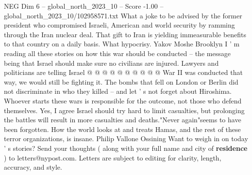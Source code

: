 \begin{textsample}{NEG Dim 6 – global\_north\_2023\_10 – Score -1.00 – global\_north\_2023\_10/102958571.txt}
What a joke to be advised by the former president who compromised Israeli, American and world security by ramming through the Iran nuclear deal.
That gift to Iran is yielding immeasurable benefits to that country on a daily basis.
What hypocrisy.
Yakov Moshe Brooklyn I ' m reading all these stories on how this war should be conducted -- the message being that Israel should make sure no civilians are injured.
Lawyers and politicians are telling Israel @ @ @ @ @ @ @ @ @ @ War II was conducted that way, we would still be fighting it.
The bombs that fell on London or Berlin did not discriminate in who they killed -- and let ' s not forget about Hiroshima.
Whoever starts these wars is responsible for the outcome, not those who defend themselves.
Yes, I agree Israel should try hard to limit casualties, but prolonging the battles will result in more casualties and deaths."Never again"seems to have been forgotten.
How the world looks at and treats Hamas, and the rest of these terror organizations, is insane.
Philip Vallone Ossining Want to weigh in on today ' s stories?
Send your thoughts ( along with your full name and city of \textbf{residence} ) to letters@nypost.com.
Letters are subject to editing for clarity, length, accuracy, and style.

\end{textsample}
